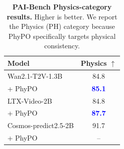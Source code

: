 \documentclass{article}
\begin{document}

\begin{table}[H]
\centering
\small
\renewcommand{\arraystretch}{1.3}
\setlength{\tabcolsep}{8pt}
\begin{tabular}{lc}
\toprule
\textbf{Model} & \textbf{Physics} $\uparrow$ \\
\midrule
Wan2.1-T2V-1.3B
& 84.8 \\
+ PhyPO
& \textbf{\textcolor{blue}{85.1}} \\
\midrule
LTX-Video-2B
& 84.8 \\
+ PhyPO
& \textbf{\textcolor{blue}{87.7}} \\
\midrule
Cosmos-predict2.5-2B
& 91.7 \\
+ PhyPO
& -- \\
\bottomrule
\end{tabular}
\caption{\textbf{PAI-Bench Physics-category results.}
Higher is better. We report the Physics (PH) category because PhyPO specifically targets physical consistency.}
\label{tab:pai_bench_physics}
\end{table}
\FloatBarrier


\end{document}
